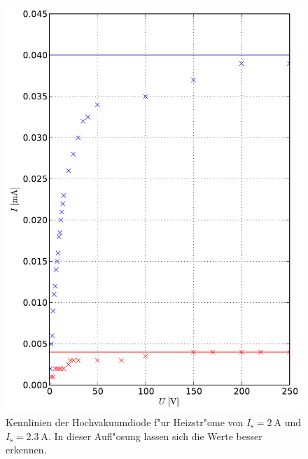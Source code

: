 		\begin{figure}[h!]
			\centering
			\includegraphics[width = 15cm]{img/kennlinie2.pdf}
			\caption{Kennlinien der Hochvakuumdiode f"ur Heizstr"ome von $I_\mathrm{s} = \SI{2}{\ampere}$ und $I_\mathrm{s} = \SI{2.3}{\ampere}$. In dieser Aufl"osung lassen sich die Werte besser erkennen.}
			\label{fig:kennlinie2}
		\end{figure}

		\clearpage

